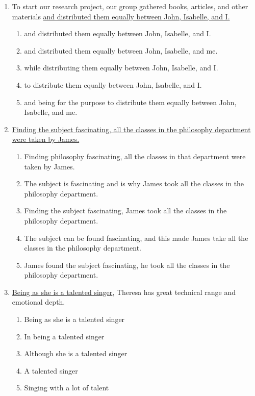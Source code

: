 \begin{enumerate}
\bigskip
\item To start our research project, our group gathered books, articles, and other materials \ul{and distributed them equally between John, Isabelle, and I.}

\begin{enumerate}[label=(\Alph*)]
\item and distributed them equally between John, Isabelle, and I.
\item and distributed them equally between John, Isabelle, and me.
\item while distributing them equally between John, Isabelle, and I.
\item to distribute them equally between John, Isabelle, and I.
\item and being for the purpose to distribute them equally between John, Isabelle, and me.
\end{enumerate}

\bigskip
\item \ul{Finding the subject fascinating, all the classes in the philosophy department were taken by James.}
\begin{enumerate}[label=(\Alph*)]
\item Finding philosophy fascinating, all the classes in that department were taken by James.
\item The subject is fascinating and is why James took all the classes in the philosophy department.
\item Finding the subject fascinating, James took all the classes in the philosophy department.
\item The subject can be found fascinating, and this made James take all the classes in the philosophy department.
\item James found the subject fascinating, he took all the classes in the philosophy department.
\end{enumerate}

\newpage
\item \underline{Being as she is a talented singer}, Theresa has great technical range and emotional depth.

\begin{enumerate}[label=(\Alph*)]
\item Being as she is a talented singer
\item In being a talented singer
\item Although she is a talented singer
\item A talented singer
\item Singing with a lot of talent
\end{enumerate}


\end{enumerate}
